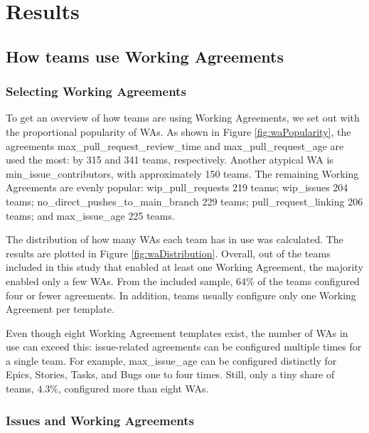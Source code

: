 \chapter{Results}

\section{How teams use Working Agreements}

\subsection{Selecting Working Agreements}

To get an overview of how teams are using Working Agreements, we set out with the proportional popularity of WAs. As shown in Figure \ref{fig:waPopularity}, the agreements max\_pull\_request\_review\_time and max\_pull\_request\_age are used the most: by 315 and 341 teams, respectively. Another atypical WA is min\_issue\_contributors, with approximately 150 teams. The remaining Working Agreements are evenly popular: wip\_pull\_requests 219 teams; wip\_issues 204 teams; no\_direct\_pushes\_to\_main\_branch 229 teams; pull\_request\_linking 206 teams; and max\_issue\_age 225 teams.



The distribution of how many WAs each team has in use was calculated. The results are plotted in Figure \ref{fig:waDistribution}. Overall, out of the teams included in this study that enabled at least one Working Agreement, the majority enabled only a few WAs. From the included sample, $64\%$ of the teams configured four or fewer agreements. In addition, teams usually configure only one Working Agreement per template.



Even though eight Working Agreement templates exist, the number of WAs in use can exceed this: issue-related agreements can be configured multiple times for a single team. For example, max\_issue\_age can be configured distinctly for Epics, Stories, Tasks, and Bugs one to four times. Still, only a tiny share of teams, $4.3\%$, configured more than eight WAs.

\subsection{Issues and Working Agreements}

